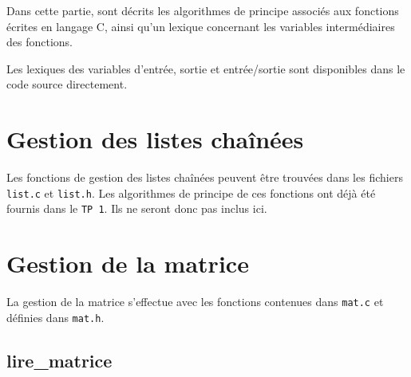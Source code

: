 Dans cette partie, sont décrits les algorithmes de principe associés aux fonctions écrites en langage C, ainsi qu'un lexique concernant les variables intermédiaires des fonctions.

Les lexiques des variables d'entrée, sortie et entrée/sortie sont disponibles dans le code source directement.

\section{Gestion des listes chaînées}
  Les fonctions de gestion des listes chaînées peuvent être trouvées dans les fichiers \texttt{list.c} et \texttt{list.h}.
  Les algorithmes de principe de ces fonctions ont déjà été fournis dans le \texttt{TP 1}. Ils ne seront donc pas inclus ici.

\section{Gestion de la matrice}
  La gestion de la matrice s'effectue avec les fonctions contenues dans \texttt{mat.c} et définies dans \texttt{mat.h}.
    
\subsection{lire\_matrice}
  \begin{algo}[informal] %
    \BEGIN
          \ENDIF
        \ENDWHILE
      \ELSE
      \ENDIF
    \END
  \end{algo}
  
  \begin{algo}[informal] %
    \VAR
    \ENDVAR
  \end{algo}
  
